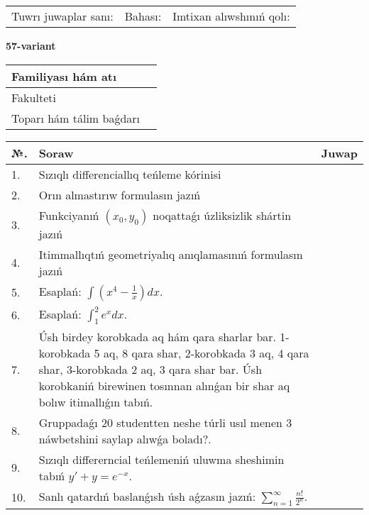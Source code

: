 \documentclass{article}
\begin{document}
\vspace{1cm}

\begin{tabular}{ c c c }
Tuwrı juwaplar sanı: \underline{\hspace{2cm}} & Bahası: \underline{\hspace{2cm}} & Imtixan alıwshınıń qolı: \underline{\hspace{2cm}} \\
\end{tabular}

\newpage

\begin{center}\textbf{57-variant}\end{center}

\bgroup
\def\arraystretch{1.5}
\begin{tabular}{ |m{6cm}|m{10cm}| }
  \hline
  Familiyası hám atı & \\
  \hline
  Fakulteti &\\
  \hline
  Toparı hám tálim baǵdarı & \\
  \hline
\end{tabular}
\egroup

\vspace{0.5cm}

\bgroup
\def\arraystretch{2}
\begin{tabular}{ |l|m{8cm}|m{7cm}| }
  \hline
  №. & Soraw & Juwap \\
  \hline
  1. & Sızıqlı differenciallıq teńleme kórinisi &  \\
  \hline
  2. & Orın almastırıw formulasın jazıń &  \\
  \hline
  3. & Funkciyanıń $(x_{0}, y_{0})$ noqattaǵı úzliksizlik shártin jazıń &  \\
  \hline
  4. & Itimmallıqtıń geometriyalıq anıqlamasınıń formulasın jazıń &  \\
  \hline
  5. & Esaplań: $\displaystyle\int \left( x^{4}-\frac{1}{x} \right)dx$. &  \\
  \hline
  6. & Esaplań: $\displaystyle\int_{1}^{2}{e^{x}dx}$. &  \\
  \hline
  7. & Úsh birdey korobkada aq hám qara sharlar bar. 1-korobkada 5 aq, 8 qara shar, 2-korobkada 3 aq, 4 qara shar, 3-korobkada 2 aq, 3 qara shar bar. Úsh korobkaniń birewinen tosınnan alınǵan bir shar aq bolıw itimallıǵın tabıń. &  \\
  \hline
  8. & Gruppadaǵı 20 studentten neshe túrli usıl menen 3 náwbetshini saylap alıwǵa boladı?. &  \\
  \hline
  9. & Sızıqlı differerncial teńlemeniń uluwma sheshimin tabıń $y' + y =e^{-x}$. &  \\
  \hline
  10. & Sanlı qatardıń baslanǵısh úsh aǵzasın jazıń: $\displaystyle\sum_{n = 1}^{\infty}\frac{n!}{2^{n}}$. &  \\
  \hline
\end{tabular}
\egroup
\end{document}
